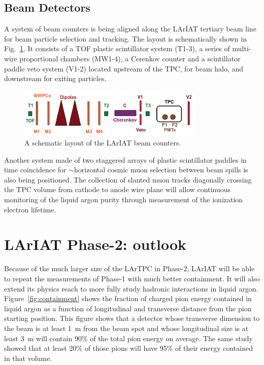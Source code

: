 \documentclass[DIV=calc, paper=a4, fontsize=10pt, twocolumn]{scrartcl}	 %
\begin{document}
{\subsection{Beam Detectors}

A system of beam counters is being aligned along the LArIAT tertiary beam line for beam particle selection and tracking. The layout is schematically shown in Fig.~\ref{fig:beam-counters}. It consists of a TOF plastic scintillator system (T1-3), a series of multi-wire proportional chambers (MW1-4), a Cerenkov counter and a scintillator paddle veto system (V1-2) located upstream of the TPC, for beam halo, and downstream for exiting particles.
\begin{figure}[h!]
\centering
\includegraphics[width=3.5in]{Figures/BeamCounters}
\caption{{\scriptsize \sf A schematic layout of the LArIAT beam counters.} }
\label{fig:beam-counters} 
\end{figure}
Another system made of two staggered arrays of plastic scintillator paddles in time coincidence for $\sim$horizontal cosmic muon selection between beam spills is also being positioned. The collection of slanted muon tracks diagonally crossing the TPC volume from cathode to anode wire plane will allow continuous monitoring of the liquid argon purity through measurement of the ionization electron lifetime. 


\section{LArIAT Phase-2: outlook}

Because of the much larger size of the LArTPC in Phase-2, LArIAT will be able to repeat the measurements of Phase-1 with much better containment.  It will also extend its physics reach to more fully study hadronic interactions in liquid argon.  Figure~\ref{fig:containment} shows the fraction of charged pion energy contained in liquid argon as a function of longitudinal and transverse distance from the pion starting position.  This figure shows that a detector whose transverse dimension to the beam is at least 1~m from the beam spot and whose longitudinal size is at least 3~m will contain 90\% of the total pion energy on average.  The same study showed that at least 20\% of those pions will have 95\% of their energy contained in that volume.

}
\end{document}
